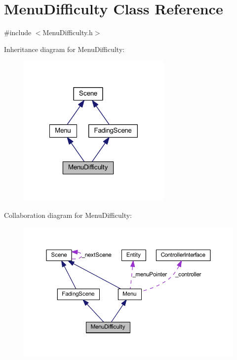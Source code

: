 \hypertarget{class_menu_difficulty}{
\section{MenuDifficulty Class Reference}
\label{d7/d22/class_menu_difficulty}
}


{\ttfamily \#include $<$MenuDifficulty.h$>$}



Inheritance diagram for MenuDifficulty:
\nopagebreak
\begin{figure}[H]
\begin{center}
\leavevmode
\includegraphics[width=213pt]{d8/d3e/class_menu_difficulty__inherit__graph}
\end{center}
\end{figure}


Collaboration diagram for MenuDifficulty:
\nopagebreak
\begin{figure}[H]
\begin{center}
\leavevmode
\includegraphics[width=367pt]{da/d90/class_menu_difficulty__coll__graph}
\end{center}
\end{figure}

